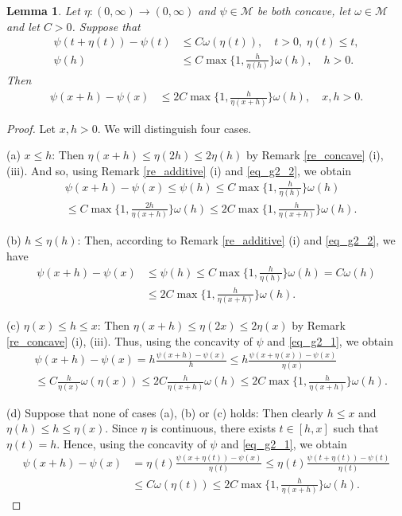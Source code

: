 \documentclass[10pt,a4paper]{amsart}
\newtheorem{lemma}[theorem]{Lemma}
\theoremstyle{definition}
\newcommand{\M}{\mathcal{M}}
\begin{document}
\begin{lemma}\label{le_g2}
Let $ \eta:(0,\infty)\to (0,\infty) $ and $ \psi\in\M $ be both concave, let $ \omega\in\M $ and let $ C>0 $. Suppose that
\begin{align}
\psi(t+\eta(t))-\psi(t)&\leq C\omega(\eta(t)),\quad t>0,\;\eta(t)\leq t,\label{eq_g2_1}\\
\psi(h)&\leq C\max\bigg\lbrace 1,\frac{h}{\eta(h)}\bigg\rbrace\omega(h),\quad h>0.\label{eq_g2_2}
\end{align}
Then
\begin{align*}
\psi(x+h)-\psi(x)&\leq 2C\max\bigg\lbrace 1,\frac{h}{\eta(x+h)}\bigg\rbrace\omega(h),\quad x,h>0.
\end{align*}
\end{lemma}

\begin{proof}
Let $ x,h>0 $. We will distinguish four cases.

(a) $ x\leq h $: Then $ \eta(x+h)\leq\eta(2h)\leq 2\eta(h) $ by Remark \ref{re_concave} (i), (iii). And so, using  Remark \ref{re_additive} (i) and \eqref{eq_g2_2}, we obtain
\begin{align*}
&\psi(x+h)-\psi(x)\leq\psi(h)\leq C\max\bigg\lbrace 1,\frac{h}{\eta(h)}\bigg\rbrace\omega(h)\\
&\leq C\max\bigg\lbrace 1,\frac{2h}{\eta(x+h)}\bigg\rbrace\omega(h)\leq 2C\max\bigg\lbrace 1,\frac{h}{\eta(x+h)}\bigg\rbrace\omega(h).
\end{align*}

(b) $ h\leq\eta(h) $: Then, according to Remark \ref{re_additive} (i) and \eqref{eq_g2_2}, we have
\begin{align*}
\psi(x+h)-\psi(x)&\leq\psi(h)\leq C\max\bigg\lbrace 1,\frac{h}{\eta(h)}\bigg\rbrace\omega(h)=C\omega(h)\\
&\leq 2C\max\bigg\lbrace 1,\frac{h}{\eta(x+h)}\bigg\rbrace\omega(h).
\end{align*}

(c) $ \eta(x)\leq h\leq x $: Then $ \eta(x+h)\leq\eta(2x)\leq 2\eta(x) $ by Remark \ref{re_concave} (i), (iii). Thus, using the concavity of $ \psi $ and \eqref{eq_g2_1}, we obtain
\begin{align*}
&\psi(x+h)-\psi(x)=h\frac{\psi(x+h)-\psi(x)}{h}\leq h\frac{\psi(x+\eta(x))-\psi(x)}{\eta(x)}\\
&\leq C\frac{h}{\eta(x)}\omega(\eta(x))\leq 2C\frac{h}{\eta(x+h)}\omega(h)\leq 2C\max\bigg\lbrace 1,\frac{h}{\eta(x+h)}\bigg\rbrace\omega(h).
\end{align*}

(d) Suppose that none of cases (a), (b) or (c) holds: Then clearly $ h\leq x $ and $ \eta(h)\leq h\leq\eta(x) $. Since $ \eta $ is continuous, there exists $ t\in [h,x] $ such that $ \eta(t)=h $. Hence, using the concavity of $ \psi $ and \eqref{eq_g2_1}, we obtain
\begin{align*}
\psi(x+h)-\psi(x)&=\eta(t)\frac{\psi(x+\eta(t))-\psi(x)}{\eta(t)}\leq\eta(t)\frac{\psi(t+\eta(t))-\psi(t)}{\eta(t)}\\&\leq C\omega(\eta(t))\leq 2C\max\bigg\lbrace 1,\frac{h}{\eta(x+h)}\bigg\rbrace\omega(h).
\end{align*}
\end{proof}
\end{document}

